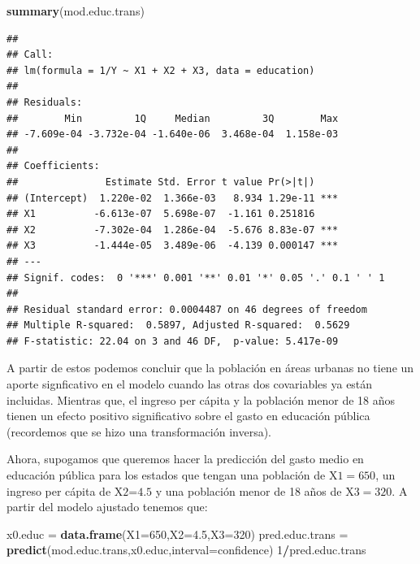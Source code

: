 \documentclass[
]{article}
\newenvironment{Shaded}{\begin{snugshade}}{\end{snugshade}}
\newcommand{\AttributeTok}[1]{\textcolor[rgb]{0.13,0.29,0.53}{#1}}
\newcommand{\DecValTok}[1]{\textcolor[rgb]{0.00,0.00,0.81}{#1}}
\newcommand{\FloatTok}[1]{\textcolor[rgb]{0.00,0.00,0.81}{#1}}
\newcommand{\FunctionTok}[1]{\textcolor[rgb]{0.13,0.29,0.53}{\textbf{#1}}}
\newcommand{\NormalTok}[1]{#1}
\newcommand{\OtherTok}[1]{\textcolor[rgb]{0.56,0.35,0.01}{#1}}
\newcommand{\SpecialCharTok}[1]{\textcolor[rgb]{0.81,0.36,0.00}{\textbf{#1}}}
\newcommand{\StringTok}[1]{\textcolor[rgb]{0.31,0.60,0.02}{#1}}
\begin{document}
\begin{Shaded}
\begin{Highlighting}[]
\FunctionTok{summary}\NormalTok{(mod.educ.trans)}
\end{Highlighting}
\end{Shaded}

\begin{verbatim}
## 
## Call:
## lm(formula = 1/Y ~ X1 + X2 + X3, data = education)
## 
## Residuals:
##        Min         1Q     Median         3Q        Max 
## -7.609e-04 -3.732e-04 -1.640e-06  3.468e-04  1.158e-03 
## 
## Coefficients:
##               Estimate Std. Error t value Pr(>|t|)    
## (Intercept)  1.220e-02  1.366e-03   8.934 1.29e-11 ***
## X1          -6.613e-07  5.698e-07  -1.161 0.251816    
## X2          -7.302e-04  1.286e-04  -5.676 8.83e-07 ***
## X3          -1.444e-05  3.489e-06  -4.139 0.000147 ***
## ---
## Signif. codes:  0 '***' 0.001 '**' 0.01 '*' 0.05 '.' 0.1 ' ' 1
## 
## Residual standard error: 0.0004487 on 46 degrees of freedom
## Multiple R-squared:  0.5897, Adjusted R-squared:  0.5629 
## F-statistic: 22.04 on 3 and 46 DF,  p-value: 5.417e-09
\end{verbatim}

A partir de estos podemos concluir que la población en áreas urbanas no tiene un aporte signficativo en el modelo cuando las otras dos covariables ya están incluidas. Mientras que, el ingreso per cápita y la población menor de 18 años tienen un efecto positivo significativo sobre el gasto en educación pública (recordemos que se hizo una transformación inversa).

Ahora, supogamos que queremos hacer la predicción del gasto medio en educación pública para los estados que tengan una población de \(\mbox{X1}=650\), un ingreso per cápita de \(\mbox{X2=4.5}\) y una población menor de 18 años de \(\mbox{X3}=320\). A partir del modelo ajustado tenemos que:

\begin{Shaded}
\begin{Highlighting}[]
\NormalTok{x0.educ }\OtherTok{=} \FunctionTok{data.frame}\NormalTok{(}\AttributeTok{X1=}\DecValTok{650}\NormalTok{,}\AttributeTok{X2=}\FloatTok{4.5}\NormalTok{,}\AttributeTok{X3=}\DecValTok{320}\NormalTok{)}
\NormalTok{pred.educ.trans }\OtherTok{=} \FunctionTok{predict}\NormalTok{(mod.educ.trans,x0.educ,}\AttributeTok{interval=}\StringTok{\textquotesingle{}confidence\textquotesingle{}}\NormalTok{) }
\DecValTok{1}\SpecialCharTok{/}\NormalTok{pred.educ.trans}
\end{Highlighting}
\end{Shaded}
\end{document}
